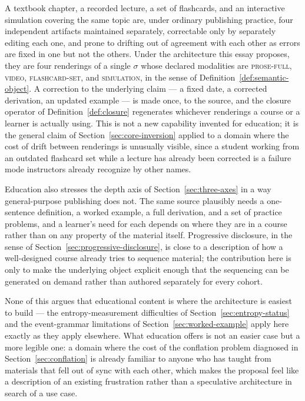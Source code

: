 \documentclass[11pt]{article}
\theoremstyle{definition}
\begin{document}
A textbook chapter, a recorded lecture, a set of flashcards, and an interactive simulation covering the same topic are, under ordinary publishing practice, four independent artifacts maintained separately, correctable only by separately editing each one, and prone to drifting out of agreement with each other as errors are fixed in one but not the others. Under the architecture this essay proposes, they are four renderings of a single $\sigma$ whose declared modalities are \textsc{prose-full}, \textsc{video}, \textsc{flashcard-set}, and \textsc{simulation}, in the sense of Definition~\ref{def:semantic-object}. A correction to the underlying claim --- a fixed date, a corrected derivation, an updated example --- is made once, to the source, and the closure operator of Definition~\ref{def:closure} regenerates whichever renderings a course or a learner is actually using. This is not a new capability invented for education; it is the general claim of Section~\ref{sec:core-inversion} applied to a domain where the cost of drift between renderings is unusually visible, since a student working from an outdated flashcard set while a lecture has already been corrected is a failure mode instructors already recognize by other names.

Education also stresses the depth axis of Section~\ref{sec:three-axes} in a way general-purpose publishing does not. The same source plausibly needs a one-sentence definition, a worked example, a full derivation, and a set of practice problems, and a learner's need for each depends on where they are in a course rather than on any property of the material itself. Progressive disclosure, in the sense of Section~\ref{sec:progressive-disclosure}, is close to a description of how a well-designed course already tries to sequence material; the contribution here is only to make the underlying object explicit enough that the sequencing can be generated on demand rather than authored separately for every cohort.

None of this argues that educational content is where the architecture is easiest to build --- the entropy-measurement difficulties of Section~\ref{sec:entropy-status} and the event-grammar limitations of Section~\ref{sec:worked-example} apply here exactly as they apply elsewhere. What education offers is not an easier case but a more legible one: a domain where the cost of the conflation problem diagnosed in Section~\ref{sec:conflation} is already familiar to anyone who has taught from materials that fell out of sync with each other, which makes the proposal feel like a description of an existing frustration rather than a speculative architecture in search of a use case.
\end{document}
